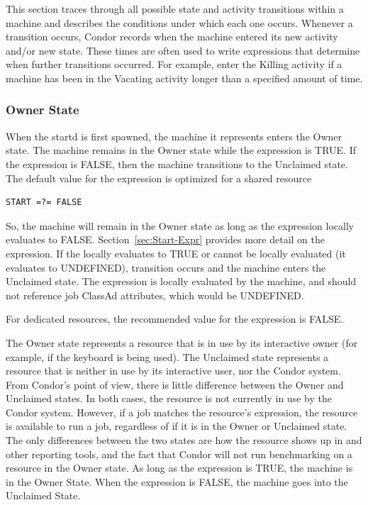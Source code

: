 This section traces through all possible state and activity
transitions within a machine and describes the conditions under which
each one occurs.
Whenever a transition occurs, Condor records when the machine entered its
new activity and/or new state.
These times are often used to write expressions that determine
when further transitions occurred.
For example, enter the Killing activity if a machine has been in
the Vacating activity longer than a specified amount of time. 

\subsubsection{\label{sec:Owner-State}
Owner State}

When the startd is first spawned, the machine it represents enters the
Owner state. 
The machine remains in the Owner state while the
expression  is TRUE.
If the  expression is FALSE,
then the machine transitions to the Unclaimed state.
The default value for the 
 expression is optimized for a shared resource
\begin{verbatim}
START =?= FALSE
\end{verbatim}
So,
the machine will remain in the Owner state as long as the 
expression locally evaluates to FALSE.
Section~\ref{sec:Start-Expr} provides more detail on the
 expression.
If the  locally evaluates to TRUE or cannot be locally
evaluated (it evaluates to UNDEFINED), transition 
occurs and the machine enters the Unclaimed state.
The  expression is locally evaluated by the machine,
and should not reference job ClassAd attributes, which would be
UNDEFINED.

For dedicated resources, the recommended value for the 
expression is FALSE.

The Owner state represents a resource that is in use by its
interactive owner (for example, if the keyboard is being used).
The Unclaimed state represents a resource that is neither in use by
its interactive user, nor the Condor system.
From Condor's point of view, there is little difference between the
Owner and Unclaimed states.
In both cases, the resource is not currently in use by the Condor
system.
However, if a job matches the resource's  expression, the
resource is available to run a job, regardless of if it is in the
Owner or Unclaimed state.
The only differences between the two states are how the resource shows
up in  and other reporting tools, and the fact that
Condor will not run benchmarking on a resource in the Owner state.
As long as the  expression is TRUE, the machine is
in the Owner State.
When the  expression is FALSE, the machine goes into
the Unclaimed State.

